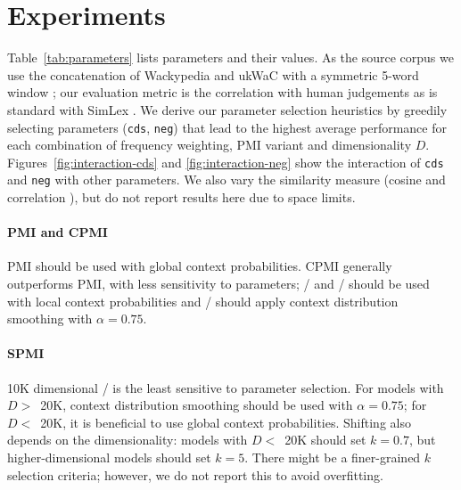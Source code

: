\documentclass[11pt]{article}
\begin{document}
\section{Experiments}
\label{sec:lexical-experiments}

Table~\ref{tab:parameters} lists parameters and their values. As the source corpus we use the concatenation of Wackypedia and ukWaC \cite{Baroni2009} with a symmetric 5-word window \cite{milajevs-EtAl:2014:EMNLP2014}; our evaluation metric is the correlation with human judgements as is standard with SimLex \cite{hill2014simlex}. We derive our parameter selection heuristics by greedily selecting parameters (\texttt{cds}, \texttt{neg}) that lead to the highest average performance for each combination of frequency weighting, PMI variant and dimensionality $D$. Figures~\ref{fig:interaction-cds} and \ref{fig:interaction-neg} show the interaction of \texttt{cds} and \texttt{neg} with other parameters. We also vary the similarity measure (cosine and correlation  \cite{kiela-clark:2014:CVSC}), but do not report results here due to space limits.\footnotemark{}


\paragraph{PMI and CPMI}

PMI should be used with global context probabilities. CPMI generally outperforms PMI, with less sensitivity to parameters; \NCPMI/ and \logNCPMI/ should be used with local context probabilities and \CPMI/ should apply context distribution smoothing with $\alpha = 0.75$.

\paragraph{SPMI}

10K dimensional \SPMI/ is the least sensitive to parameter selection. For models with $D>$~20K, context distribution smoothing should be used with $\alpha = 0.75$; for $D<$~20K, it is beneficial to use global context probabilities. Shifting also depends on the dimensionality: models with $D<$~20K should set $k = 0.7$, but higher-dimensional models should set $k = 5$. There might be a finer-grained $k$ selection criteria; however, we do not report this to avoid overfitting.


\end{document}
